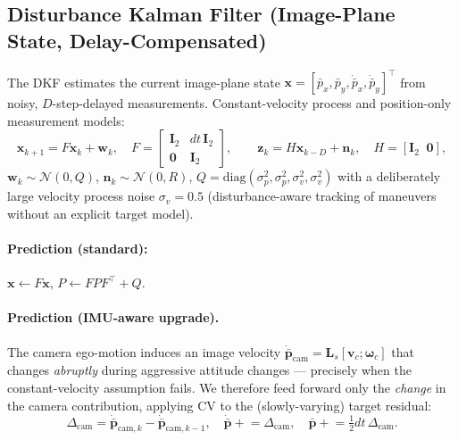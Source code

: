 \documentclass[11pt]{article}
\begin{document}
\subsection{Disturbance Kalman Filter (Image-Plane State, Delay-Compensated)}
\label{sec:dkf}
The DKF estimates the current image-plane state
$\mathbf x=[\bar p_x,\bar p_y,\dot{\bar p}_x,\dot{\bar p}_y]^\top$ from noisy,
$D$-step-delayed measurements. Constant-velocity process and position-only
measurement models:
\begin{equation}
\mathbf x_{k+1}=F\mathbf x_k+\mathbf w_k,\quad
F=\begin{bmatrix}\mathbf I_2 & dt\,\mathbf I_2\\ \mathbf 0 & \mathbf I_2\end{bmatrix},
\qquad
\mathbf z_k=H\mathbf x_{k-D}+\mathbf n_k,\quad H=[\mathbf I_2\;\;\mathbf 0],
\end{equation}
$\mathbf w_k\sim\mathcal N(0,Q)$, $\mathbf n_k\sim\mathcal N(0,R)$,
$Q=\mathrm{diag}(\sigma_p^2,\sigma_p^2,\sigma_v^2,\sigma_v^2)$ with a
deliberately large velocity process noise $\sigma_v=0.5$ (disturbance-aware
tracking of maneuvers without an explicit target model).
\paragraph{Prediction (standard):}
$\mathbf x\leftarrow F\mathbf x$, $P\leftarrow FPF^\top+Q$.
\paragraph{Prediction (IMU-aware upgrade).} The camera ego-motion induces an
image velocity $\dot{\bar{\mathbf p}}_\text{cam}=\mathbf L_s
[\mathbf v_c;\bm\omega_c]$ that changes \emph{abruptly} during aggressive
attitude changes --- precisely when the constant-velocity assumption fails.
We therefore feed forward only the \emph{change} in the camera contribution,
applying CV to the (slowly-varying) target residual:
\begin{equation}
\Delta_\text{cam}=\dot{\bar{\mathbf p}}_{\text{cam},k}-\dot{\bar{\mathbf p}}_{\text{cam},k-1},\quad
\dot{\bar{\mathbf p}}\!\mathrel{+}=\!\Delta_\text{cam},\quad
\bar{\mathbf p}\!\mathrel{+}=\!\tfrac12 dt\,\Delta_\text{cam}.
\end{equation}
\end{document}
